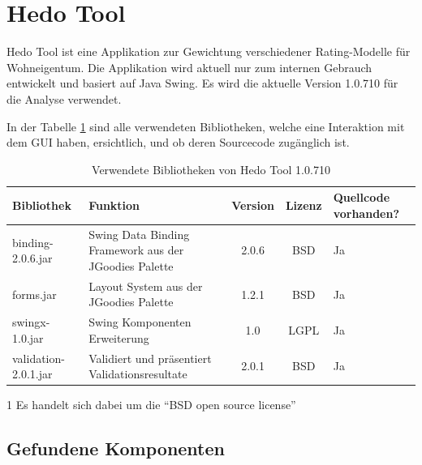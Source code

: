   \section{Hedo Tool}
  
  Hedo Tool ist eine Applikation zur Gewichtung verschiedener Rating-Modelle
  für Wohneigentum. Die Applikation wird aktuell nur zum internen Gebrauch
  entwickelt und basiert auf Java Swing. Es wird die aktuelle Version 1.0.710
  für die Analyse verwendet.
  
  In der Tabelle \ref{tab:bibliothekenHedoTool} sind alle verwendeten
  Bibliotheken, welche eine Interaktion mit dem \ac{GUI} haben, ersichtlich,
  und ob deren Sourcecode zugänglich ist.  
  
  \begin{table}[ht]
    \sffamily 
    \begin{center}
      \begin{threeparttable}
        \begin{tabular}{lp{4.5cm}ccp{2cm}}
          \toprule
          Bibliothek & Funktion & Version & Lizenz & Quellcode vorhanden?\\
          \midrule
          binding-2.0.6.jar & Swing Data Binding Framework aus der JGoodies
          Palette & 2.0.6 & BSD\tnote{1} & Ja\\
          forms.jar & Layout System aus der JGoodies Palette & 1.2.1 &
          BSD\tnote{1} & Ja\\
          swingx-1.0.jar & Swing Komponenten Erweiterung & 1.0 & LGPL & Ja\\
          validation-2.0.1.jar & Validiert und präsentiert Validationsresultate
          & 2.0.1 & BSD\tnote{1} & Ja\\
          \bottomrule
        \end{tabular}
        \caption{Verwendete Bibliotheken von Hedo Tool 1.0.710}
        \label{tab:bibliothekenHedoTool}
        \begin{tablenotes}[++]\footnotesize 
          \item[1] Es handelt sich dabei um die ``BSD open source license''
        \end{tablenotes} 
      \end{threeparttable}
    \end{center}
  \end{table}
  
  \subsection{Gefundene Komponenten}
  
